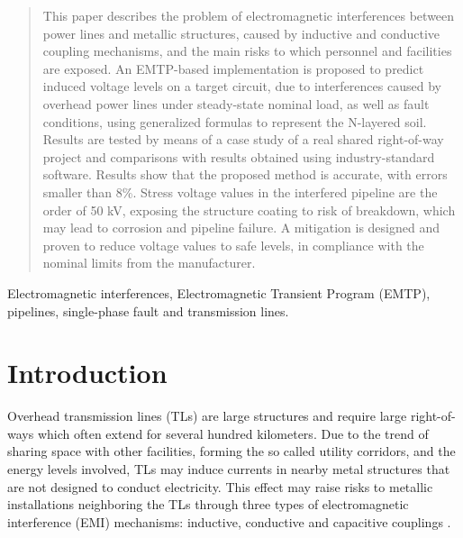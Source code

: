 \documentclass{IEEEtran4PSCC}
\begin{document}
\begin{abstract}
This paper describes the problem of electromagnetic interferences between power lines and metallic structures, caused by inductive and conductive coupling mechanisms, and the main risks to which personnel and facilities are exposed. An EMTP-based implementation is proposed to predict induced voltage levels on a target circuit, due to interferences caused by overhead power lines under steady-state nominal load, as well as fault conditions, using generalized formulas to represent the N-layered soil. Results are tested by means of a case study of a real shared right-of-way project and comparisons with results obtained using industry-standard software. Results show that the proposed method is accurate, with errors smaller than 8\%. Stress voltage values in the interfered pipeline are the order of 50 kV, exposing the structure  coating to risk of breakdown, which may lead to corrosion and pipeline failure. A mitigation is designed and proven to reduce voltage values to safe levels, in compliance with the nominal limits from the manufacturer.
\end{abstract}

\begin{IEEEkeywords}
Electromagnetic interferences, Electromagnetic Transient Program (EMTP), pipelines, single-phase fault and transmission lines.
\end{IEEEkeywords}




\section{Introduction}


Overhead transmission lines (TLs) are large structures and
require large right-of-ways which often extend for several hundred kilometers. Due to the trend of sharing space with other facilities, forming the so called utility corridors, and the energy levels involved,  TLs may induce currents in nearby metal structures that are not designed to conduct electricity. This effect may raise risks to metallic installations neighboring the TLs through three types of electromagnetic interference (EMI) mechanisms: inductive, conductive and capacitive couplings \cite{CIGREWG36}.
\end{document}
